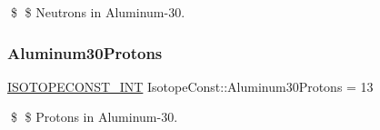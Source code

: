 \$ \$ Neutrons in Aluminum-\/30. \mbox{\label{group___isotope_const-_aluminum-_al30_ga40e144b601fa502bb95a6fbaf54033ef}} 
\subsubsection{\texorpdfstring{Aluminum30\+Protons}{Aluminum30Protons}}
{\footnotesize\ttfamily \mbox{\hyperlink{group___isotope_const-_macros_ga5f18360b3e99483a35c32d789e62621c}{I\+S\+O\+T\+O\+P\+E\+C\+O\+N\+S\+T\+\_\+\+I\+NT}} Isotope\+Const\+::\+Aluminum30\+Protons = 13}

\$ \$ Protons in Aluminum-\/30. 